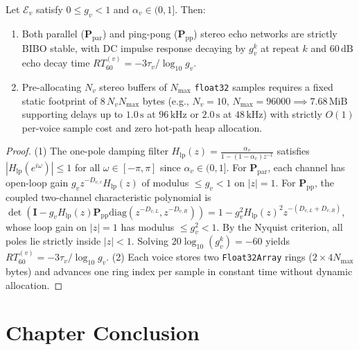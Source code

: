 \begin{theorem}
\label{thm:echo-stable}
Let $\mathcal{E}_v$ satisfy $0 \le g_v < 1$ and $\alpha_v \in (0, 1]$. Then:
\begin{enumerate}[leftmargin=1.5em]
  \item Both parallel ($\mathbf{P}_{\mathrm{par}}$) and ping-pong ($\mathbf{P}_{\mathrm{pp}}$) stereo echo networks are strictly BIBO stable, with DC impulse response decaying by $g_v^k$ at repeat $k$ and $60\,\text{dB}$ echo decay time $RT_{60}^{(v)} = -3\tau_v / \log_{10} g_v$.
  \item Pre-allocating $N_v$ stereo buffers of $N_{\max}$ \texttt{float32} samples requires a fixed static footprint of $8\,N_v N_{\max}$ bytes (e.g., $N_v = 10$, $N_{\max} = 96000 \implies 7.68\,\text{MiB}$ supporting delays up to $1.0\,\text{s}$ at $96\,\text{kHz}$ or $2.0\,\text{s}$ at $48\,\text{kHz}$) with strictly $O(1)$ per-voice sample cost and zero hot-path heap allocation.
\end{enumerate}
\end{theorem}

\begin{proof}
(1) The one-pole damping filter $H_{\mathrm{lp}}(z) = \frac{\alpha_v}{1 - (1-\alpha_v)z^{-1}}$ satisfies $|H_{\mathrm{lp}}(e^{i\omega})| \le 1$ for all $\omega \in [-\pi, \pi]$ since $\alpha_v \in (0, 1]$. For $\mathbf{P}_{\mathrm{par}}$, each channel has open-loop gain $g_v z^{-D_{v,c}} H_{\mathrm{lp}}(z)$ of modulus $\le g_v < 1$ on $|z| = 1$. For $\mathbf{P}_{\mathrm{pp}}$, the coupled two-channel characteristic polynomial is $\det(\mathbf{I} - g_v H_{\mathrm{lp}}(z)\mathbf{P}_{\mathrm{pp}}\mathrm{diag}(z^{-D_{v,L}}, z^{-D_{v,R}})) = 1 - g_v^2 H_{\mathrm{lp}}(z)^2 z^{-(D_{v,L}+D_{v,R})}$, whose loop gain on $|z| = 1$ has modulus $\le g_v^2 < 1$. By the Nyquist criterion, all poles lie strictly inside $|z| < 1$. Solving $20\log_{10}(g_v^k) = -60$ yields $RT_{60}^{(v)} = -3\tau_v / \log_{10} g_v$.
(2) Each voice stores two \texttt{Float32Array} rings ($2 \times 4 N_{\max}$ bytes) and advances one ring index per sample in constant time without dynamic allocation.
\end{proof}

\section{Chapter Conclusion}

